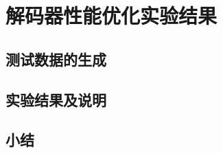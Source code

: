 

\chapter{解码器性能优化实验结果}
\label{cha:optresultandanalysis}

\section{测试数据的生成}
\label{sec:optresultsgeneration}

\section{实验结果及说明}
\label{sec:optresult}





\section{小结}
\label{sec:sum6}